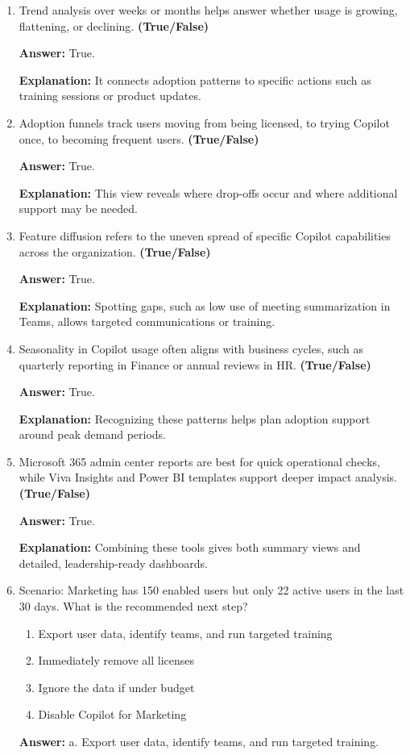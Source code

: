 \documentclass[10pt]{article}
\begin{document}
\begin{enumerate}[leftmargin=*]
\textbf{Answer:} True.

\textbf{Explanation:} Minimum group size, exclusion lists, and privacy settings must be configured to protect personal information.

\item Trend analysis over weeks or months helps answer whether usage is growing, flattening, or declining. \textbf{(True/False)}

\textbf{Answer:} True.

\textbf{Explanation:} It connects adoption patterns to specific actions such as training sessions or product updates.

\item Adoption funnels track users moving from being licensed, to trying Copilot once, to becoming frequent users. \textbf{(True/False)}

\textbf{Answer:} True.

\textbf{Explanation:} This view reveals where drop-offs occur and where additional support may be needed.

\item Feature diffusion refers to the uneven spread of specific Copilot capabilities across the organization. \textbf{(True/False)}

\textbf{Answer:} True.

\textbf{Explanation:} Spotting gaps, such as low use of meeting summarization in Teams, allows targeted communications or training.

\item Seasonality in Copilot usage often aligns with business cycles, such as quarterly reporting in Finance or annual reviews in HR. \textbf{(True/False)}

\textbf{Answer:} True.

\textbf{Explanation:} Recognizing these patterns helps plan adoption support around peak demand periods.

\item Microsoft 365 admin center reports are best for quick operational checks, while Viva Insights and Power BI templates support deeper impact analysis. \textbf{(True/False)}

\textbf{Answer:} True.

\textbf{Explanation:} Combining these tools gives both summary views and detailed, leadership-ready dashboards.

\item Scenario: Marketing has 150 enabled users but only 22 active users in the last 30 days. What is the recommended next step?
\begin{enumerate}[label=\alph*., leftmargin=1.5em]
\item Export user data, identify teams, and run targeted training
\item Immediately remove all licenses
\item Ignore the data if under budget
\item Disable Copilot for Marketing
\end{enumerate}
\textbf{Answer:} a. Export user data, identify teams, and run targeted training.


\end{enumerate}
\end{document}
